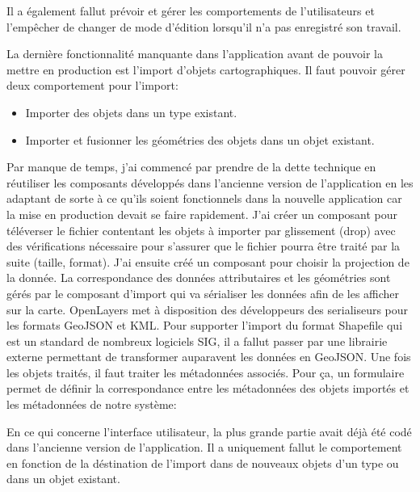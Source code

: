 \documentclass{rapportUHA40}
\begin{document}
Il a également fallut prévoir et gérer les comportements de l'utilisateurs et
l'empêcher de changer de mode d'édition lorsqu'il n'a pas enregistré son
travail.

La dernière fonctionnalité manquante dans l'application avant de pouvoir la
mettre en production est l'import d'objets cartographiques. Il faut pouvoir
gérer deux comportement pour l'import:
\begin{itemize}
  \item Importer des objets dans un type existant.
  \item Importer et fusionner les géométries des objets dans un objet existant.
\end{itemize}

Par manque de temps, j'ai commencé par prendre de la dette technique en
réutiliser les composants développés dans l'ancienne version de l'application
en les adaptant de sorte à ce qu'ils soient fonctionnels dans la nouvelle
application car la mise en production devait se faire rapidement. J'ai créer un
composant pour téléverser le fichier contentant les objets à importer par
glissement (drop) avec des vérifications nécessaire pour s'assurer que le
fichier pourra être traité par la suite (taille, format). J'ai ensuite créé un
composant pour choisir la projection de la donnée. La correspondance des
données attributaires et les géométries sont gérés par le composant d'import
qui va sérialiser les données afin de les afficher sur la carte. OpenLayers met
à disposition des développeurs des serialiseurs pour les formats GeoJSON et
KML\@. Pour supporter l'import du format Shapefile qui est un standard de
nombreux logiciels SIG, il a fallut passer par une librairie externe permettant
de transformer auparavent les données en GeoJSON\@. Une fois les objets
traités, il faut traiter les métadonnées associés. Pour ça, un formulaire
permet de définir la correspondance entre les métadonnées des objets importés
et les métadonnées de notre système:

En ce qui concerne l'interface utilisateur, la plus grande partie avait déjà
été codé dans l'ancienne version de l'application. Il a uniquement fallut le
comportement en fonction de la déstination de l'import dans de nouveaux objets
d'un type ou dans un objet existant. \\
\end{document}
